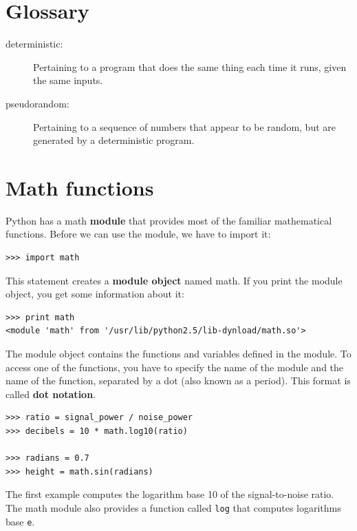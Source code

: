 \documentclass[10pt]{book}
\begin{document}
\section{Glossary}

\begin{description}

\item[deterministic:] Pertaining to a program that does the same
thing each time it runs, given the same inputs.

\item[pseudorandom:] Pertaining to a sequence of numbers that appear
to be random, but are generated by a deterministic program.

\end{description}


\section{Math functions}

Python has a math {\bf module} that provides most of the familiar
mathematical functions.  
Before we can use the module, we have to import it:

\beforeverb
\begin{verbatim}
>>> import math
\end{verbatim}
\afterverb
%
This statement creates a {\bf module object} named math.  If
you print the module object, you get some information about it:

\beforeverb
\begin{verbatim}
>>> print math
<module 'math' from '/usr/lib/python2.5/lib-dynload/math.so'>
\end{verbatim}
\afterverb
%
The module object contains the functions and variables defined in the
module.  To access one of the functions, you have to specify the name
of the module and the name of the function, separated by a dot (also
known as a period).  This format is called {\bf dot notation}.


\beforeverb
\begin{verbatim}
>>> ratio = signal_power / noise_power
>>> decibels = 10 * math.log10(ratio)

>>> radians = 0.7
>>> height = math.sin(radians)
\end{verbatim}
\afterverb
%
The first example computes the logarithm base 10 of the
signal-to-noise ratio.  The math module also provides a
function called {\tt log} that computes logarithms base {\tt e}.
\end{document}
